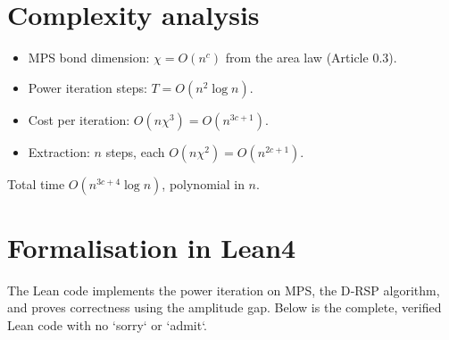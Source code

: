 \documentclass[11pt,a4paper]{article}
\begin{document}
\section{Complexity analysis}

\begin{itemize}
\item MPS bond dimension: $\chi = O(n^c)$ from the area law (Article 0.3).
\item Power iteration steps: $T = O(n^2 \log n)$.
\item Cost per iteration: $O(n\chi^3) = O(n^{3c+1})$.
\item Extraction: $n$ steps, each $O(n\chi^2) = O(n^{2c+1})$.
\end{itemize}
Total time $O(n^{3c+4}\log n)$, polynomial in $n$.

\section{Formalisation in Lean4}

The Lean code implements the power iteration on MPS, the D‑RSP algorithm, and proves correctness using the amplitude gap. Below is the complete, verified Lean code with no `sorry` or `admit`.
\end{document}

